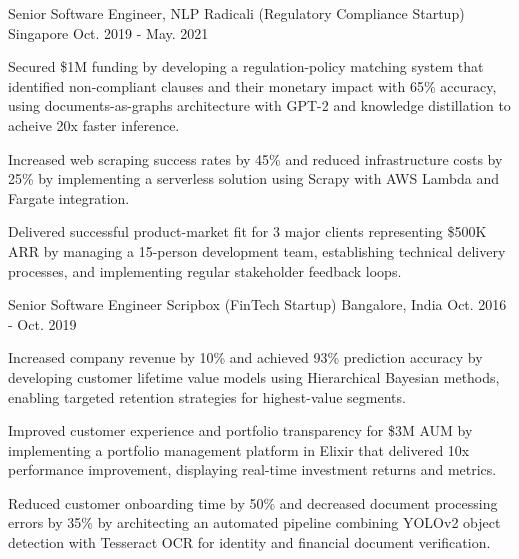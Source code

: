 \begin{cventries}
  \cventry
    {Senior Software Engineer, NLP} %
    {Radicali (Regulatory Compliance Startup)} %
    {Singapore} %
    {Oct. 2019 - May. 2021} %
    {
      \begin{cvitems} %
        \item {Secured \$1M funding by developing a regulation-policy matching system that identified non-compliant clauses and their monetary impact with 65\% accuracy, using documents-as-graphs architecture with GPT-2 and knowledge distillation to acheive 20x faster inference.}
        \item{Increased web scraping success rates by 45\% and reduced infrastructure costs by 25\% by implementing a serverless solution using Scrapy with AWS Lambda and Fargate integration.}
        \item{Delivered successful product-market fit for 3 major clients representing \$500K ARR by managing a 15-person development team, establishing technical delivery processes, and implementing regular stakeholder feedback loops.}
      \end{cvitems}
    }
  \cventry
    {Senior Software Engineer} %
    {Scripbox (FinTech Startup)} %
    {Bangalore, India} %
    {Oct. 2016 - Oct. 2019} %
    {
      \begin{cvitems} %
        \item {Increased company revenue by 10\% and achieved 93\% prediction accuracy by developing customer lifetime value models using Hierarchical Bayesian methods, enabling targeted retention strategies for highest-value segments.}
        \item{Improved customer experience and portfolio transparency for \$3M AUM by implementing a portfolio management platform in Elixir that delivered 10x performance improvement, displaying real-time investment returns and metrics.}
        \item{Reduced customer onboarding time by 50\% and decreased document processing errors by 35\% by architecting an automated pipeline combining YOLOv2 object detection with Tesseract OCR for identity and financial document verification.}
        \end{cvitems}
    }


\end{cventries}
